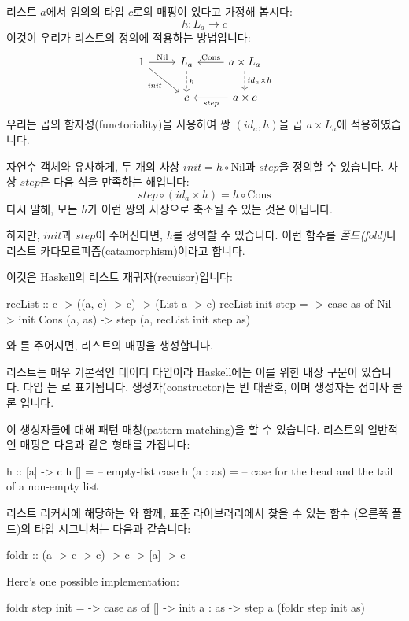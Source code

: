 \documentclass[DaoFP]{subfiles}
\begin{document}
리스트 $a$에서 임의의 타입 $c$로의 매핑이 있다고 가정해 봅시다:
\[h \colon L_a \to c\]
이것이 우리가 리스트의 정의에 적용하는 방법입니다:
\[
 \begin{tikzcd}
 1
 \arrow[r, "\text{Nil}"]
 \arrow[rd, "\mathit{init}"']
 &L_a
\arrow[d, dashed, "h"]
&a \times L_a
  \arrow[l, "\text{Cons}"']
\arrow[d, dashed, "id_a \times h"]
\\
& c
& a \times c
\arrow[l, "\mathit{step}"]
  \end{tikzcd}
\]
우리는 곱의 함자성(functoriality)을 사용하여 쌍 $(id_a, h)$을 곱 $a \times L_a$에 적용하였습니다.

자연수 객체와 유사하게, 두 개의 사상 $\mathit{init} = h \circ \text{Nil}$과 $\mathit{step}$을 정의할 수 있습니다. 사상 $\mathit{step}$은 다음 식을 만족하는 해입니다:
\[ \mathit{step} \circ (id_a \times h) = h \circ \text{Cons} \]
다시 말해, 모든 $h$가 이런 쌍의 사상으로 축소될 수 있는 것은 아닙니다.

하지만, $\mathit{init}$과 $\mathit{step}$이 주어진다면, $h$를 정의할 수 있습니다. 이런 함수를 \emph{폴드(fold)}나 리스트 카타모르피즘(catamorphism)이라고 합니다.

이것은 Haskell의 리스트 재귀자(recuisor)입니다:
\begin{haskell}
recList :: c -> ((a, c) -> c) -> (List a -> c)
recList init step = \as ->
  case as of 
    Nil          -> init
    Cons (a, as) -> step (a, recList init step as)
\end{haskell}
와 를 주어지면, 리스트의 매핑을 생성합니다.

리스트는 매우 기본적인 데이터 타입이라 Haskell에는 이를 위한 내장 구문이 있습니다. 타입 는 \hask{[a]}로 표기됩니다.  생성자(constructor)는 빈 대괄호, \hask{[]}이며  생성자는 접미사 콜론 \hask{(:)}입니다.

이 생성자들에 대해 패턴 매칭(pattern-matching)을 할 수 있습니다. 리스트의 일반적인 매핑은 다음과 같은 형태를 가집니다:
\begin{haskell}
h :: [a] -> c
h []      = -- empty-list case
h (a : as) = -- case for the head and the tail of a non-empty list
\end{haskell}

리스트 리커서에 해당하는 와 함께, 표준 라이브러리에서 찾을 수 있는 함수  (오른쪽 폴드)의 타입 시그니처는 다음과 같습니다:
\begin{haskell}
foldr :: (a -> c -> c) -> c -> [a] -> c
\end{haskell}
Here's one possible implementation:
\begin{haskell}
foldr step init = \as ->
  case as of
    [] -> init
    a : as -> step a (foldr step init as)
\end{haskell}
\end{document}
